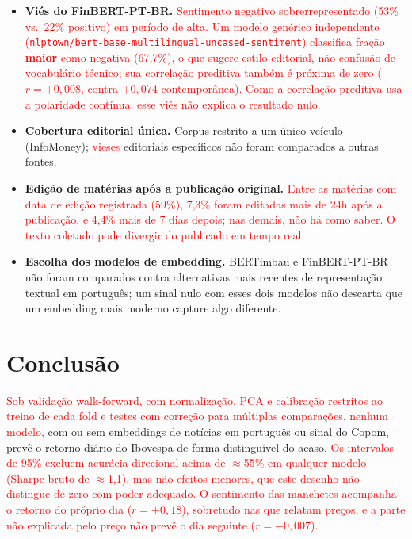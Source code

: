 \documentclass[conference]{IEEEtran}
\newcommand{\novo}[1]{\textcolor{red}{#1}}
\begin{document}
\begin{itemize}
\item \textbf{Vi\'es do FinBERT-PT-BR.} \novo{Sentimento negativo sobrerrepresentado (53\% vs.\ 22\% positivo) em per\'iodo de alta. Um modelo gen\'erico independente (\texttt{nlptown/\allowbreak bert-base-\allowbreak multilingual-\allowbreak uncased-\allowbreak sentiment}) classifica fra\c{c}\~ao \textbf{maior} como negativa (67,7\%), o que sugere estilo editorial, n\~ao confus\~ao de vocabul\'ario t\'ecnico; sua correla\c{c}\~ao preditiva tamb\'em \'e pr\'oxima de zero ($r=+0{,}008$, contra $+0{,}074$ contempor\^anea). Como a correla\c{c}\~ao preditiva usa a polaridade cont\'inua, esse vi\'es n\~ao explica o resultado nulo.}
\item \textbf{Cobertura editorial \'unica.} Corpus restrito a um \'unico ve\'iculo (InfoMoney); \novo{vieses} editoriais espec\'ificos n\~ao foram comparados a outras fontes.
\item \textbf{Edi\c{c}\~ao de mat\'erias ap\'os a publica\c{c}\~ao original.} \novo{Entre as mat\'erias com data de edi\c{c}\~ao registrada (59\%), 7,3\% foram editadas mais de 24h ap\'os a publica\c{c}\~ao, e 4,4\% mais de 7 dias depois; nas demais, n\~ao h\'a como saber. O texto coletado pode divergir do publicado em tempo real.}
\item \textbf{Escolha dos modelos de embedding.} BERTimbau e FinBERT-PT-BR n\~ao foram comparados contra alternativas mais recentes de representa\c{c}\~ao textual em portugu\^es; um sinal nulo com esses dois modelos n\~ao descarta que um embedding mais moderno capture algo diferente.
\end{itemize}

\section{Conclus\~ao}
\label{sec:conclusao}

\novo{Sob valida\c{c}\~ao walk-forward, com normaliza\c{c}\~ao, PCA e calibra\c{c}\~ao restritos ao treino de cada fold e testes com corre\c{c}\~ao para m\'ultiplas compara\c{c}\~oes, nenhum modelo,} com ou sem embeddings de not\'icias em portugu\^es ou sinal do Copom, prev\^e o retorno di\'ario do Ibovespa de forma distingu\'ivel do acaso. \novo{Os intervalos de 95\% excluem acur\'acia direcional acima de $\approx$55\% em qualquer modelo (Sharpe bruto de $\approx$1,1), mas n\~ao efeitos menores, que este desenho n\~ao distingue de zero com poder adequado. O sentimento das manchetes acompanha o retorno do pr\'oprio dia ($r=+0{,}18$), sobretudo nas que relatam pre\c{c}os, e a parte n\~ao explicada pelo pre\c{c}o n\~ao prev\^e o dia seguinte ($r=-0{,}007$).}
\end{document}
